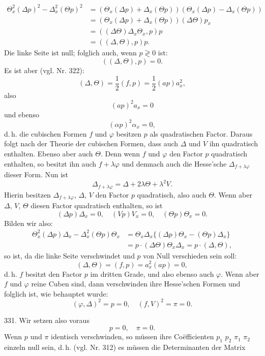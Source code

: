 \documentclass[11pt]{article}
\providecommand{\gesperrt}[1]{\textls[130]{#1}}
\providecommand{\weberpage}[1]{}
\let\Delta\varDelta
\let\Theta\varTheta
\begin{document}
\weberpage{352}
\[
\begin{aligned}
\Theta_x^2(\Delta p)^2 - \Delta_x^2(\Theta p)^2 &= (\Theta_x(\Delta p)+\Delta_x(\Theta p))(\Theta_x(\Delta p)-\Delta_x(\Theta p))\\
&= (\Theta_x(\Delta p)+\Delta_x(\Theta p))(\Delta\Theta)p_x\\
&= ((\Delta\Theta)\Delta_x\Theta_x,p)p\\
&= ((\Delta,\Theta),p)p.
\end{aligned}
\]
Die linke Seite ist null; folglich auch, wenn $p\gtrless0$ ist:
\[
((\Delta,\Theta),p) = 0.
\]
Es ist aber (vgl. Nr. 322):
\[
(\Delta,\Theta) = \frac{1}{2}(f,p) = \frac{1}{2}(ap)a_x^2,
\]
also
\[
(ap)^2a_x = 0
\]
und ebenso
\[
(\alpha p)^2\alpha_x = 0,
\]
d.\,h. die cubischen Formen $f$ und $\varphi$ besitzen $p$ als quadratischen Factor. Daraus folgt nach der Theorie der cubischen Formen, dass auch $\Delta$ und $V$ ihn quadratisch enthalten. Ebenso aber auch $\Theta$. Denn wenn $f$ und $\varphi$ den Factor $p$ quadratisch enthalten, so besitzt ihn auch $f+\lambda\varphi$ und demnach auch die Hesse'sche $\Delta_{f+\lambda\varphi}$ dieser Form. Nun ist
\[
\Delta_{f+\lambda\varphi} = \Delta + 2\lambda\Theta + \lambda^2V.
\]
Hierin besitzen $\Delta_{f+\lambda\varphi}$, $\Delta$, $V$ den Factor $p$ quadratisch, also auch $\Theta$. Wenn aber $\Delta$, $V$, $\Theta$ diesen Factor quadratisch enthalten, so ist
\[
(\Delta p)\Delta_x = 0,\quad (Vp)V_x = 0,\quad (\Theta p)\Theta_x = 0.
\]
Bilden wir also:
\[
\begin{aligned}
\Theta_x^2(\Delta p)\Delta_x - \Delta_x^2(\Theta p)\Theta_x &= \Theta_x\Delta_x\{(\Delta p)\Theta_x-(\Theta p)\Delta_x\}\\
&= p\cdot(\Delta\Theta)\Theta_x\Delta_x = p\cdot(\Delta,\Theta),
\end{aligned}
\]
so ist, da die linke Seite verschwindet und $p$ von Null verschieden sein soll:
\[
(\Delta,\Theta) = (f,p) = a_x^2(ap) = 0,
\]
d.\,h. $f$ besitzt den Factor $p$ im dritten Grade, und also ebenso auch $\varphi$. Wenn aber $f$ und $\varphi$ reine Cuben sind, dann verschwinden ihre Hesse'schen Formen und folglich ist, wie behauptet wurde:
\[
(\varphi,\Delta)^2 = p = 0,\quad (f,V)^2 = \pi = 0.
\]

331. \gesperrt{Folgerungen f\"ur $f$ und $\varphi$.} Wir setzen also voraus
\[
p=0,\quad \pi=0.
\]
Wenn $p$ und $\pi$ identisch verschwinden, so m\"ussen ihre Co\"efficienten $p_1$ $p_2$ $\pi_1$ $\pi_2$ einzeln null sein, d.\,h. (vgl. Nr. 312) es m\"ussen die Determinanten der Matrix
\end{document}
